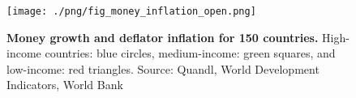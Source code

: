 \begin{figure}[h]
\caption{\label{fig:money_inflation_open} \textbf{Money growth and deflator inflation for 150 countries.} High-income countries: blue circles, medium-income: green squares, and low-income: red triangles. {\tiny Source: Quandl, World Development Indicators, World Bank}}
\hspace*{-.5cm}\texttt{[image: ./png/fig\_money\_inflation\_open.png]}
\end{figure}
